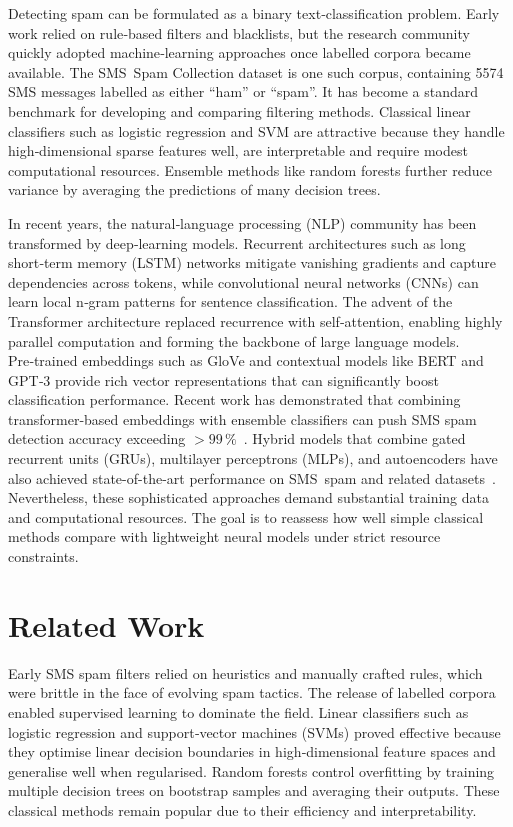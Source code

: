 \documentclass[conference]{IEEEtran}
\begin{document}
Detecting spam can be formulated as a binary text‑classification problem.  Early work relied on rule‑based filters and blacklists, but the research community quickly adopted machine‑learning approaches once labelled corpora became available.  The SMS Spam Collection dataset is one such corpus, containing 5574 SMS messages labelled as either “ham” or “spam”.  It has become a standard benchmark for developing and comparing filtering methods.  Classical linear classifiers such as logistic regression and SVM are attractive because they handle high‑dimensional sparse features well, are interpretable and require modest computational resources.  Ensemble methods like random forests further reduce variance by averaging the predictions of many decision trees.

In recent years, the natural‑language processing (NLP) community has been transformed by deep‑learning models.  Recurrent architectures such as long short‑term memory (LSTM) networks mitigate vanishing gradients and capture dependencies across tokens\cite{hochreiter1997}, while convolutional neural networks (CNNs) can learn local n‑gram patterns for sentence classification\cite{kim2014}.  The advent of the Transformer architecture replaced recurrence with self‑attention, enabling highly parallel computation and forming the backbone of large language models\cite{vaswani2017}.  Pre‑trained embeddings such as GloVe\cite{pennington2014} and contextual models like BERT and GPT‑3\cite{devlin2019,brown2020} provide rich vector representations that can significantly boost classification performance.  Recent work has demonstrated that combining transformer‑based embeddings with ensemble classifiers can push SMS spam detection accuracy exceeding $>99\,\%$~\cite{bilgen2024}. Hybrid models that combine gated recurrent units (GRUs), multilayer perceptrons (MLPs), and autoencoders have also achieved state-of-the-art performance on SMS~spam and related datasets~\cite{bilgen2024}. Nevertheless, these sophisticated approaches demand substantial training data and computational resources. The goal is to reassess how well simple classical methods compare with lightweight neural models under strict resource constraints.


\section{Related Work}

Early SMS spam filters relied on heuristics and manually crafted rules, which were brittle in the face of evolving spam tactics.  The release of labelled corpora enabled supervised learning to dominate the field.  Linear classifiers such as logistic regression and support‑vector machines (SVMs) proved effective because they optimise linear decision boundaries in high‑dimensional feature spaces and generalise well when regularised\cite{joachims1998}.  Random forests control overfitting by training multiple decision trees on bootstrap samples and averaging their outputs\cite{breiman2001}.  These classical methods remain popular due to their efficiency and interpretability.
\end{document}

